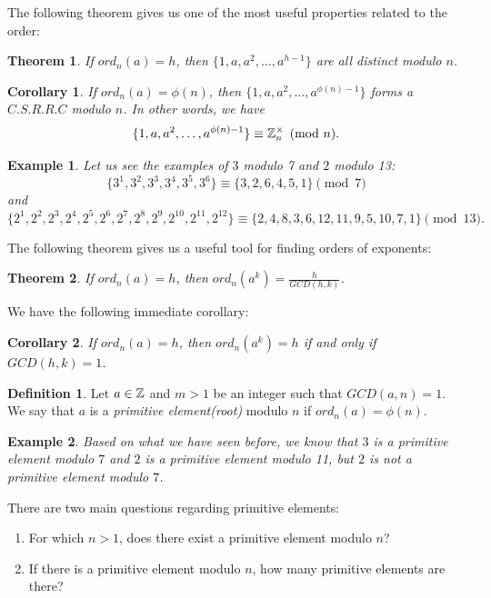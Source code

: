 \documentclass[12pt]{article}
\theoremstyle{plain}
\newtheorem{corollary}{Corollary}
\newtheorem{example}{Example}
\newtheorem{theorem}{Theorem}
\theoremstyle{definition}
\newtheorem{definition}{Definition}
\theoremstyle{remark}
\begin{document}
\bigskip
\noindent

The following theorem gives us one of the most useful properties related to the order:
\begin{theorem}
If $ord_n(a)=h$, then $\{1,a,a^2, \dots, a^{h-1}\}$ are all distinct modulo $n$.
\end{theorem}

\begin{corollary}
If $ord_n(a)=\phi(n)$, then $\{1,a, a^2, \dots, a^{\phi(n)-1}\}$ forms a $C.S.R.R.C$ modulo $n$. In other words, we have
$$\{1,a, a^2, \dots, a^{\phi(n)-1}\} \equiv \mathbb{Z}_n^{\times} \pmod{n}.$$
\end{corollary}
\begin{example}
Let us see the examples of $3$ modulo 7 and $2$ modulo 13:
$$\{3^1, 3^2, 3^3, 3^4, 3^5, 3^6\} \equiv \{3, 2, 6, 4, 5, 1\} \pmod{7}$$ and
$$\{2^1, 2^2, 2^3, 2^4, 2^5, 2^6, 2^7, 2^8, 2^9, 2^{10}, 2^{11}, 2^{12}\} \equiv \{2, 4, 8, 3, 6, 12, 11, 9, 5, 10, 7, 1\} \pmod{13}.$$
\end{example}

\bigskip
\noindent
The following theorem gives us a useful tool for finding orders of exponents:
\begin{theorem}
If $ord_n(a)=h$, then $ord_n(a^k) = \frac{h}{GCD(h,k)}$.
\end{theorem}

\bigskip
\noindent
We have the following immediate corollary:
\begin{corollary}
If $ord_{n}(a)=h$, then $ord_n(a^k)=h$ if and only if $GCD(h,k)=1$.
\end{corollary}

\bigskip
\noindent
\begin{definition}
Let $a\in \mathbb{Z}$ and $m>1$ be an integer such that $GCD(a,n)=1$. We say that $a$ is a {\it primitive element(root)} modulo $n$ if $ord_n(a)=\phi(n)$.
\end{definition}

\begin{example}
Based on what we have seen before, we know that $3$ is a primitive element modulo $7$ and $2$ is a primitive element modulo 11, but $2$ is not a primitive element modulo $7$.
\end{example}

\bigskip
\noindent
There are two main questions regarding primitive elements:
\begin{enumerate}
    \item For which $n>1$, does there exist a primitive element modulo $n$?
    \item If there is a primitive element modulo $n$, how many primitive elements are there?
\end{enumerate}
\end{document}
